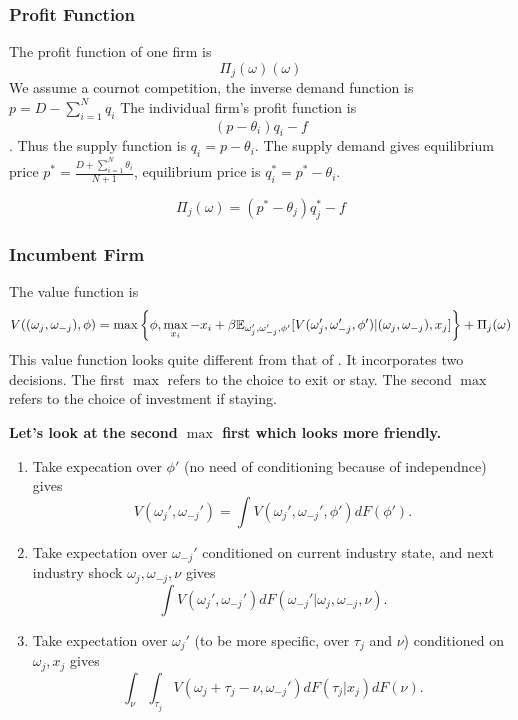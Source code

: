 \documentclass[12pt]{article}[margin=1in]
\begin{document}
\subsubsection{Profit Function}
The profit function of one firm is
\begin{equation*}
    \Pi_j(\omega)(\omega)
\end{equation*}
We assume a cournot competition, the inverse demand function is
$p = D-\sum_{i=1}^N q_i$
The individual firm's profit function is $$ (p-\theta_i)q_i-f$$. Thus the supply function is $q_i=p-\theta_i$. The supply demand gives equilibrium price $p^*=\frac{D+\sum_{i=1}^N \theta_i}{N+1}$, equilibrium price is $q_i^*=p^*-\theta_i$.

\begin{equation*}
    \Pi_j(\omega)=(p^*-\theta_j)q_j^*-f
\end{equation*}


\subsubsection{Incumbent Firm}
The value function is
\begin{equation*}
    \begin{split}
        V((\omega_j, \omega_{-j}),\phi) & = \max\left\{\phi,\max_{x_i}-x_i+\beta\mathbb{E}_{\omega_j',\omega_{-j}',\phi'}[V(\omega_j',\omega_{-j}',\phi')|(\omega_j, \omega_{-j}),x_j]\right\} + \Pi_j(\omega) \\
    \end{split}
\end{equation*}
This value function looks quite different from that of \citet{rust1987optimal}. It incorporates two decisions. The first $\max$ refers to the choice to exit or stay. The second $\max$ refers to the choice of investment if staying.

\textbf{Let's look at the second $\max$ first which looks more friendly.}

\begin{enumerate}
    \item Take expecation over $\phi'$ (no need of conditioning because of independnce) gives $$V(\omega_j',\omega_{-j}')=\int V(\omega_j', \omega_{-j}', \phi')dF(\phi').$$
    \item Take expectation over $\omega_{-j}'$ conditioned on current industry state, and next industry shock $\omega_j,\omega_{-j},\nu$ gives $$\int V(\omega_j', \omega_{-j}')dF(\omega_{-j}'|\omega_j,\omega_{-j},\nu).$$
    \item Take expectation over $\omega_j'$ (to be more specific, over $\tau_j$ and $\nu$) conditioned on $\omega_j,x_j$ gives $$\int_\nu \int_{\tau_j} V(\omega_j+\tau_j-\nu, \omega_{-j}')dF(\tau_j|x_j)dF(\nu).$$
\end{enumerate}
\end{document}
